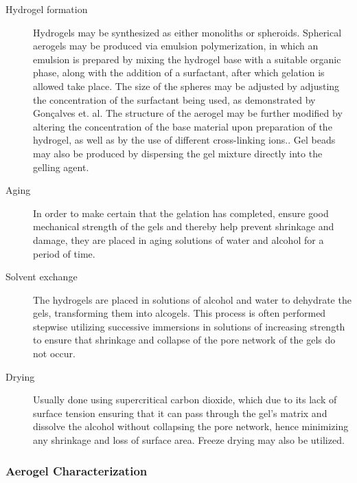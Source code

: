 \documentclass[a4paper,12pt]{article}
\begin{document}
\begin{description}
  \item[Hydrogel formation] Hydrogels may be synthesized as either monoliths or spheroids.\supercite{stergar_review_2016} Spherical aerogels may be produced via emulsion polymerization, in which an emulsion is prepared by mixing the hydrogel base with a suitable organic phase, along with the addition of a surfactant, after which gelation is allowed take place.  The size of the spheres may be adjusted by adjusting the concentration of the surfactant being used, as demonstrated by Gonçalves et. al.\supercite{goncalves_alginate-based_2016} The structure of the aerogel may be further modified by altering the concentration of the base material upon preparation of the hydrogel, as well as by the use of different cross-linking ions.\supercite{mallepally_superabsorbent_2013}. Gel beads may also be produced by dispersing the gel mixture directly into the gelling agent.
  
\item[Aging] In order to make certain that the gelation has completed, ensure good mechanical strength of the gels and thereby help prevent shrinkage and damage, they are placed in aging solutions of water and alcohol for a period of time.
  
\item[Solvent exchange] The hydrogels are placed in solutions of alcohol and water to dehydrate the gels, transforming them into alcogels. This process is often performed stepwise utilizing successive immersions in solutions of increasing strength to ensure that shrinkage and collapse of the pore network of the gels do not occur. 

\item[Drying] Usually done using supercritical carbon dioxide, which due to its lack of surface tension ensuring that it can pass through the gel’s matrix and dissolve the alcohol without collapsing the pore network, hence minimizing any shrinkage and loss of surface area. Freeze drying may also be utilized.

\end{description}

\subsubsection{Aerogel Characterization}
\end{document}
